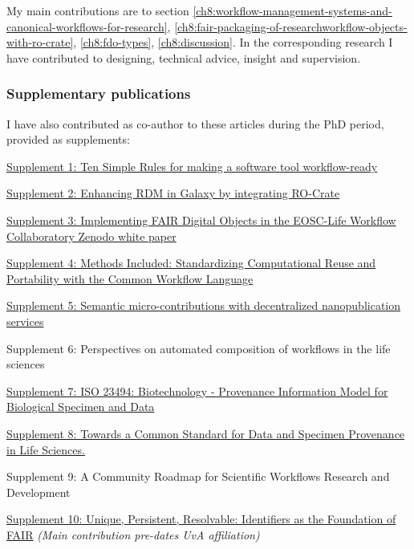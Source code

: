 My main contributions are to section \ref{ch8:workflow-management-systems-and-canonical-workflows-for-research}, \ref{ch8:fair-packaging-of-researchworkflow-objects-with-ro-crate}, \ref{ch8:fdo-types},
\ref{ch8:discussion}. In the corresponding research I have contributed to designing, technical advice, insight and supervision.


\hypertarget{supplementary-publications}{%
\subsubsection{Supplementary
publications}\label{ch10:supplementary-publications}}

I have also contributed as co-author to these articles during the PhD
period, provided as supplements:

\href{https://s11.no/2022/phd/10-simple-rules-for-workflow-tools/}{Supplement 1: Ten Simple
Rules for making a software tool workflow-ready} \cite{ch6-37}

\href{https://s11.no/2022/phd/galaxy-ro-crate/}{Supplement 2: Enhancing RDM in Galaxy by
integrating RO-Crate} \cite{De Geest 2022}

\href{https://s11.no/2021/phd/workflow-collaboratory//}{Supplement 3: Implementing FAIR
Digital Objects in the EOSC-Life Workflow Collaboratory Zenodo white
paper} \cite{Goble 2021}

\href{https://s11.no/2022/phd/methods-included/}{Supplement 4: Methods Included:
Standardizing Computational Reuse and Portability with the Common
Workflow Language} \cite{Crusoe 2022}

\href{https://s11.no/2021/phd/nanopub/}{Supplement 5: Semantic micro-contributions
with decentralized nanopublication services} \cite{Kuhn 2021}

Supplement 6:
Perspectives on automated composition of workflows in the life sciences \cite{lamprechtPerspectivesAutomatedComposition2021b}

\href{https://doi.org/10.1007/978-3-030-80960-7_16}{Supplement 7: ISO
23494: Biotechnology - Provenance Information Model for Biological
Specimen and Data}

\href{https://doi.org/10.1002/lrh2.10365}{Supplement 8: Towards a
Common Standard for Data and Specimen Provenance in Life Sciences.}

Supplement 9: A Community Roadmap for Scientific Workflows Research and Development \cite{ch6-39}

\href{https://doi.org/10.1162/dint_a_00025}{Supplement 10: Unique,
Persistent, Resolvable: Identifiers as the Foundation of FAIR} 
\emph{(Main contribution pre-dates UvA affiliation)}

